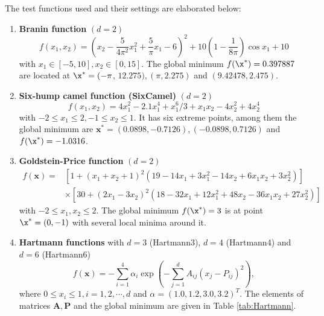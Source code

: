 \documentclass [PhD] {package/uclathes}
\begin{document}
The test functions used and their settings are elaborated below:
\begin{enumerate}
    \item \textbf{Branin function} $(d=2)$
$$
f(x_1, x_2)=\left(x_2-\frac{5}{4 \pi^2} x_1^2+\frac{5}{\pi} x_1-6\right)^2+10\left(1-\frac{1}{8 \pi}\right) \cos x_1+10
$$
with $x_1 \in[-5,10], x_2 \in[0,15]$. The global minimum $f(\x^*)=0.397887$ are located at $\x^*=(-\pi$, $12.275),(\pi, 2.275)$ and $(9.42478,2.475)$.

\item \textbf{Six-hump camel function (SixCamel)} $(d=2)$
$$
f(x_1, x_2)=4 x_1^2-2.1 x_1^4+x_1^6 / 3+x_1 x_2-4 x_2^2+4 x_2^4
$$
with $-2 \leq x_1 \leq 2,-1 \leq x_2 \leq 1$. It has six extreme points, among them the global minimum are $\boldsymbol{x}^*=(0.0898,-0.7126),(-0.0898,0.7126)$ and $f(\x^*)=-1.0316$.

\item \textbf{ Goldstein-Price function} $(d=2)$
$$
\begin{aligned}
f(\mathbf{x})= & {\left[1+\left(x_1+x_2+1\right)^2\left(19-14 x_1+3 x_1^2-14 x_2+6 x_1 x_2+3 x_2^2\right)\right] } \\
& \times\left[30+\left(2 x_1-3 x_2\right)^2\left(18-32 x_1+12 x_1^2+48 x_2-36 x_1 x_2+27 x_2^2\right)\right]
\end{aligned}
$$
with $-2 \leq x_1, x_2 \leq 2$. The global minimum $f(\x^*)=3$ is at point $\x^*=(0,-1)$ with several local minima around it.

\item \textbf{Hartmann functions} with $d=3$ (Hartmann3), $d=4$ (Hartmann4) and $d=6$ (Hartmann6)
$$
f(\boldsymbol{x})=-\sum_{i=1}^4 \alpha_i \exp \left(-\sum_{j=1}^d A_{i j}\left(x_j-P_{i j}\right)^2\right),
$$
where $0 \leq x_i \leq 1, i=1,2, \cdots, d$ and $\alpha=(1.0,1.2,3.0,3.2)^T$. The elements of matrices $\boldsymbol{A}, \boldsymbol{P}$ and the global minimum are given in Table \ref{tab:Hartmann}.
\end{enumerate}
\end{document}

